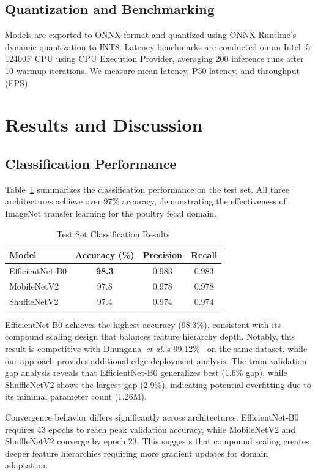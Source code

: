 \documentclass[conference,a4paper]{IEEEtran}
\begin{document}
\subsection{Quantization and Benchmarking}
Models are exported to ONNX format and quantized using ONNX Runtime's dynamic quantization to INT8. Latency benchmarks are conducted on an Intel i5-12400F CPU using CPU Execution Provider, averaging 200 inference runs after 10 warmup iterations. We measure mean latency, P50 latency, and throughput (FPS).

\section{Results and Discussion}

\subsection{Classification Performance}

Table~\ref{tab:results} summarizes the classification performance on the test set. All three architectures achieve over 97\% accuracy, demonstrating the effectiveness of ImageNet transfer learning for the poultry fecal domain.

\begin{table}[htbp]
\caption{Test Set Classification Results}
\label{tab:results}
\centering
\begin{tabular}{lccc}
\toprule
Model & Accuracy (\%) & Precision & Recall \\
\midrule
EfficientNet-B0 & \textbf{98.3} & 0.983 & 0.983 \\
MobileNetV2 & 97.8 & 0.978 & 0.978 \\
ShuffleNetV2 & 97.4 & 0.974 & 0.974 \\
\bottomrule
\end{tabular}
\end{table}

EfficientNet-B0 achieves the highest accuracy (98.3\%), consistent with its compound scaling design that balances feature hierarchy depth. Notably, this result is competitive with Dhungana~\textit{et al.}'s 99.12\%~\cite{dhungana2025} on the same dataset, while our approach provides additional edge deployment analysis. The train-validation gap analysis reveals that EfficientNet-B0 generalizes best (1.6\% gap), while ShuffleNetV2 shows the largest gap (2.9\%), indicating potential overfitting due to its minimal parameter count (1.26M).

Convergence behavior differs significantly across architectures. EfficientNet-B0 requires 43 epochs to reach peak validation accuracy, while MobileNetV2 and ShuffleNetV2 converge by epoch 23. This suggests that compound scaling creates deeper feature hierarchies requiring more gradient updates for domain adaptation.
\end{document}
